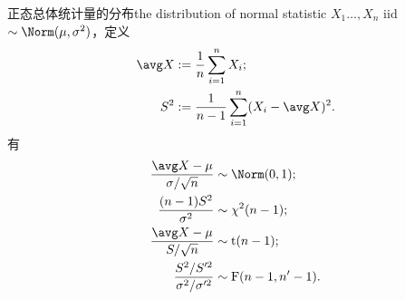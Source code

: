 

\begin{theorem}{正态总体统计量的分布}{the distribution of normal statistic}
	$X_1\ldots,X_n$ iid $\sim\Norm(\mu,\sigma^2)$，定义 
	\begin{subequations}
		\begin{align}
			\avg X&:=\frac1n\sum_{i=1}^nX_i;\\
			S^2&:=\frac1{n-1}\sum_{i=1}^n(X_i-\avg X)^2.
		\end{align}
	\end{subequations}
	有
	\begin{subequations}
		\begin{align}
			\label{sample-N}
			\frac{\avg X-\mu}{\sigma/\sqrt n}&\sim\Norm(0,1);\\
			\label{sample-chi2}
			\frac{(n-1)S^2}{\sigma^2}&\sim\chi^2(n-1);\\
			\label{sample-t}
			\frac{\avg X-\mu}{S/\sqrt n}&\sim\mathrm t(n-1);\\
			\label{2sample-F}
			\frac{S^2/S'^2}{\sigma^2/\sigma'^2}&\sim\mathrm F(n-1,n'-1).
		\end{align}
	\end{subequations}
\end{theorem}
